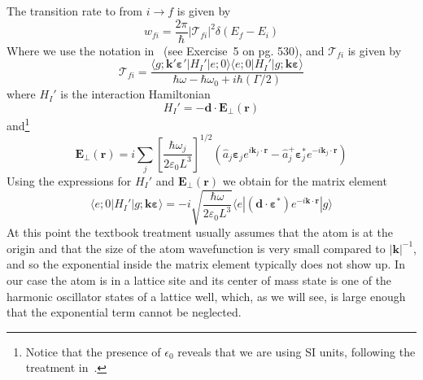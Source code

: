 \documentclass[11pt,letter]{article}
\newcommand{\bv}[1]{\ensuremath{\bm{#1}}}
\begin{document}
The transition rate to from $i\rightarrow f$ is given by 
\begin{equation}
    \label{eq:transitionRate}
    w_{fi} = \frac{2\pi}{\hbar} | \mathcal{T}_{fi} |^{2} \delta(E_{f}-E_{i})
\end{equation}
Where we use the notation in~\cite{cohen1998atom} (see Exercise~5 on pg. 530),
and $\mathcal{T}_{fi}$ is given by
\begin{equation}
    \mathcal{T}_{fi} = \frac{  
        \langle g; \bv{k}'\bv{\varepsilon}'| H_{I}' | e; 0 \rangle 
        \langle e; 0 | H_{I}' | g; \bv{k}\bv{\varepsilon} \rangle }
        { \hbar\omega - \hbar\omega_{0} + i\hbar (\Gamma/2 ) }
\end{equation} 
where $H_{I}'$ is the interaction Hamiltonian
\begin{equation}
    H_{I}' = -\bv{d} \cdot \bv{E}_{\perp} ( \bv{r} ) 
\end{equation}
and\footnote{Notice that the presence of $\epsilon_{0}$ reveals that we are
using SI units, following the treatment in~\cite{cohen1998atom}.}
\begin{equation}
    \bv{E}_{\perp}(\bv{r}) = i \sum_{j} 
        \left[ \frac{ \hbar \omega_{j} }{ 2\varepsilon_{0} L^{3}}  \right]^{1/2}
        \left( \hat{a}_{j}\bv{\varepsilon}_{j} e^{i\bv{k}_{j}\cdot\bv{r}} 
              - \hat{a}_{j}^{+}\bv{\varepsilon}_{j}^{*} e^{-i\bv{k}_{j}\cdot\bv{r}} 
        \right)
\end{equation}
Using the expressions for $H_{I}'$ and $\bv{E}_{\perp}(\bv{r})$ we obtain for
the matrix element 
\begin{equation}
   \langle e; 0 | H_{I}' | g; \bv{k}\bv{\varepsilon} \rangle = 
       -i \sqrt{ \frac{ \hbar \omega }{2 \varepsilon_{0} L^{3} }} 
      \langle e | (\bv{d} \cdot \bv{\varepsilon}^{*} ) e^{-i\bv{k}\cdot\bv{r}}| g \rangle
\end{equation}
At this point the textbook treatment usually assumes that the atom is at the
origin and that the size of the atom wavefunction is very small compared to
$|\bv{k}|^{-1}$, and so the exponential inside the matrix element typically
does not show up.  In our case the atom is in a lattice site and its center of
mass state is one of the harmonic oscillator states of a lattice well, which,
as we will see, is large enough that the exponential term cannot be neglected.  
 
\end{document}
